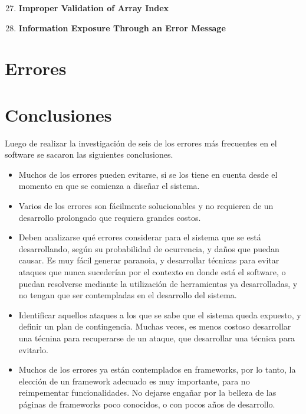 \documentclass[a4paper,10pt]{article}
\begin{document}
\begin{enumerate}
 \setcounter{enumi}{26}
 \item \textbf{Improper Validation of Array Index}
 \setcounter{enumi}{38}
 \item \textbf{Information Exposure Through an Error Message}
\end{enumerate}

\clearpage
\section{Errores}











\clearpage
\section{Conclusiones}

Luego de realizar la investigación de seis de los errores más frecuentes en el software se sacaron las siguientes
conclusiones.

\begin{itemize}
 \item Muchos de los errores pueden evitarse, si se los tiene en cuenta desde el momento en que se comienza
 a diseñar el sistema.
 \item Varios de los errores son fácilmente solucionables y no requieren de un desarrollo prolongado que requiera
 grandes costos.
 \item Deben analizarse qué errores considerar para el sistema que se está desarrollando, según su probabilidad
 de ocurrencia, y daños que puedan causar. Es muy fácil generar paranoia, y desarrollar técnicas para evitar
 ataques que nunca sucederían por el contexto en donde está el software, o puedan resolverse mediante la utilización
 de herramientas ya desarrolladas, y no tengan que ser contempladas en el desarrollo del sistema.
 \item Identificar aquellos ataques a los que se sabe que el sistema queda expuesto, y definir un plan de contingencia.
 Muchas veces, es menos costoso desarrollar una técnina para recuperarse de un ataque, que desarrollar una técnica para evitarlo.
 \item Muchos de los errores ya están contemplados en frameworks, por lo tanto, la elección de un framework adecuado
 es muy importante, para no reimpementar funcionalidades. No dejarse engañar por la belleza de las páginas de frameworks
 poco conocidos, o con pocos años de desarrollo.
\end{itemize}
\end{document}

